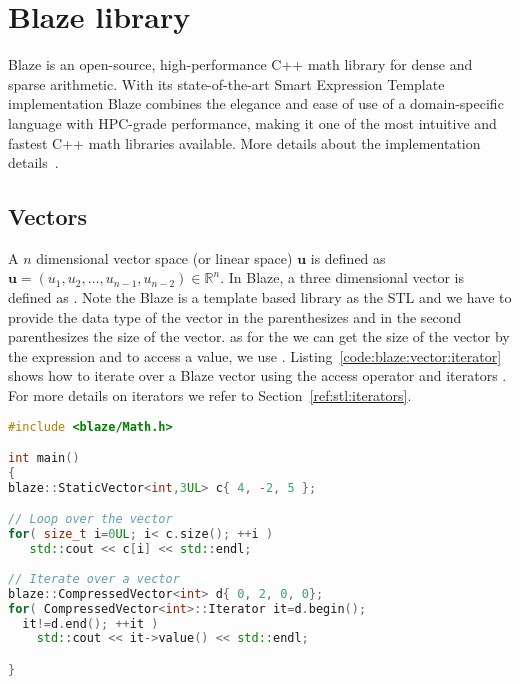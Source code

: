 \documentclass[11pt,fleqn]{book} %
\begin{document}
\section{Blaze library}
Blaze is an open-source, high-performance C++ math library for dense and sparse arithmetic. With its state-of-the-art Smart Expression Template implementation Blaze combines the elegance and ease of use of a domain-specific language with HPC-grade performance, making it one of the most intuitive and fastest C++ math libraries available. More details about the implementation details~\cite{doi:10.1137/110830125,6266939}.

\subsection{Vectors}
\label{sec:linalg:vectors}
A $n$ dimensional vector space (or linear space) $\mathbf{u}$ is defined as $\mathbf{u}=(u_1,u_2,\ldots,u_{n-1},u_{n-2})\in \mathbb{R}^n$. In Blaze, a three dimensional vector is defined as . Note the Blaze is a template based library as the STL and we have to provide the data type of the vector in the parenthesizes  and in the second parenthesizes  the size of the vector. as for the  we can get the size of the vector by the expression  and to access a value, we use . Listing~\ref{code:blaze:vector:iterator} shows how to iterate over a Blaze vector using the access operator  and iterators . For more details on iterators we refer to Section~\ref{ref:stl:iterators}. \\

\begin{lstlisting}[language=c++,caption={Iterating over a Blaze vector using a for loop with iterators.\label{code:blaze:vector:iterator}},float,floatplacement=tb]
#include <blaze/Math.h>

int main()
{
blaze::StaticVector<int,3UL> c{ 4, -2, 5 };

// Loop over the vector
for( size_t i=0UL; i< c.size(); ++i )
   std::cout << c[i] << std::endl;
   
// Iterate over a vector
blaze::CompressedVector<int> d{ 0, 2, 0, 0};
for( CompressedVector<int>::Iterator it=d.begin(); 
  it!=d.end(); ++it ) 
    std::cout << it->value() << std::endl;

}
\end{lstlisting}
\end{document}
